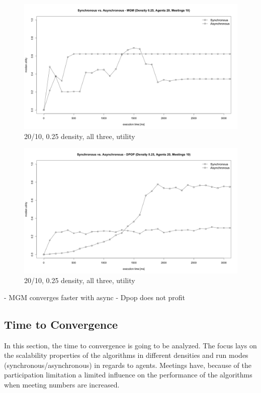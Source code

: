 \begin{figure}[H]
\centering
\includegraphics[width=430px]{graphics/experiments/static/st_12b}
\caption{20/10, 0.25 density, all three, utility}
\label{fig:mgm_graph}
\end{figure}
\begin{figure}[H]
\centering
\includegraphics[width=430px]{graphics/experiments/static/st_13}
\caption{20/10, 0.25 density, all three, utility}
\label{fig:mgm_graph}
\end{figure}

- MGM converges faster with async
- Dpop does not profit


\subsection{Time to Convergence}

In this section, the time to convergence is going to be analyzed. The focus lays on the scalability properties of the algorithms in different densities and run modes (synchronous/asynchronous) in regards to agents. Meetings have, because of the participation limitation a limited influence on the performance of the algorithms when meeting numbers are increased. 

